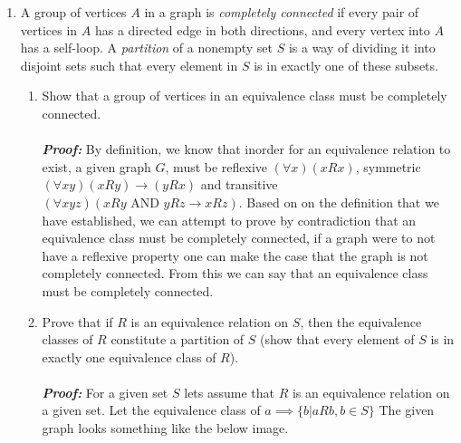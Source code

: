 \documentclass[12pt]{article}
\begin{document}
\begin{enumerate}
\begin{enumerate}
\end{enumerate}

\item A group of vertices $A$ in a graph is \textit{completely connected} if every pair of vertices in $A$ has a directed edge in both directions, and every vertex into $A$ has a self-loop. A \textit{partition} of a nonempty set $S$ is a way of dividing it into disjoint sets such that every element in $S$ is in exactly one of these subsets.
\begin{enumerate}
\item Show that a group of vertices in an equivalence class must be completely connected. \\\\
    \textbf{\textit{Proof:}} By definition, we know that inorder for an equivalence relation to exist, a given graph $G$, must be reflexive $(\forall x)(xRx)$, symmetric $(\forall xy) (xRy) \rightarrow (yRx)$ and transitive $(\forall xyz) (xRy \text{ AND } yRz \rightarrow xRz)$. Based on on the definition that we have established, we can attempt to prove by contradiction that an equivalence class must be completely connected, if a graph were to not have a reflexive property one can make the case that the graph is not completely connected. From this we can say that an equivalence class must be completely connected. 
\item  Prove that if $R$ is an equivalence relation on $S$, then the equivalence classes of $R$ constitute a partition of $S$ (show that every element of $S$ is in exactly one equivalence class of $R$).\\\\
    \textbf{\textit{Proof:}} For a given set $S$ lets assume that $R$ is an equivalence relation on a given set. Let the equivalence class of $a \implies \{ b| aRb, b \in S \}$ The given graph looks something like the below image.


\end{enumerate}
\end{enumerate}
\end{document}
